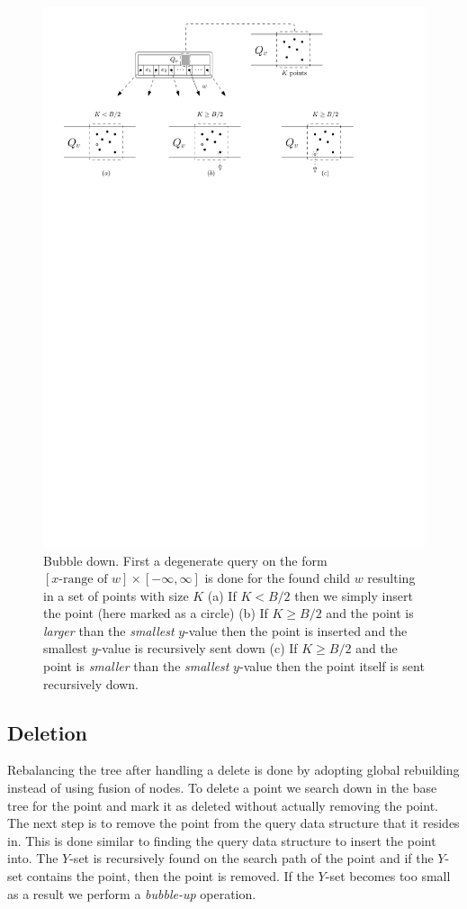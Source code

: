 \documentclass[twoside,11pt,openright]{report}
\begin{document}
\begin{figure}[t]
	\centering
	\includegraphics[width=1\textwidth]{../figures/arge_bubble_down}
	\caption{Bubble down. First a degenerate query on the form $\left[ x\text{-range of }w \right] \times \left[ - \infty, \infty \right]$ is done for the found child $w$ resulting in a set of points with size $K$ (a) If $K < B/2$ then we simply insert the point (here marked as a circle) (b) If $K \geq B/2$ and the point is \textit{larger} than the \textit{smallest} $y$-value then the point is inserted and the smallest $y$-value is recursively sent down (c) If $K \geq B/2$ and the point is \textit{smaller} than the \textit{smallest} $y$-value then the point itself is sent recursively down.}
	\label{fig:arge_bubble_down}
\end{figure}

\subsection{Deletion}
Rebalancing the tree after handling a delete is done by adopting global rebuilding instead of using fusion of nodes. To delete a point we search down in the base tree for the point and mark it as deleted without actually removing the point. The next step is to remove the point from the query data structure that it resides in. This is done similar to finding the query data structure to insert the point into. The $Y$-set is recursively found on the search path of the point and if the $Y$-set contains the point, then the point is removed. If the $Y$-set becomes too small as a result we perform a \textit{bubble-up} operation.
\end{document}
